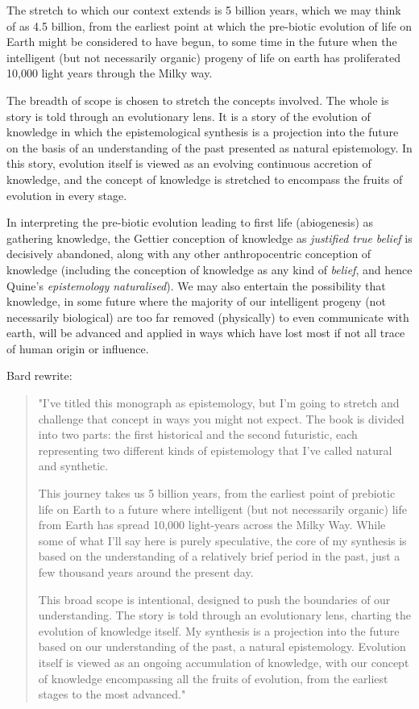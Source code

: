 \documentclass[10pt,titlepage]{book}
\begin{document}
The stretch to which our context extends is 5 billion years, which we may think of as 4.5 billion, from the earliest point at which the pre-biotic evolution of life on Earth might be considered to have begun, to some time in the future when the intelligent (but not necessarily organic) progeny of life on earth has proliferated 10,000 light years through the Milky way.

The breadth of scope is chosen to stretch the concepts involved.
The whole is story is told through an evolutionary lens.
It is a story of the evolution of knowledge in which the epistemological synthesis is a projection into the future on the basis of an understanding of the past presented as natural epistemology.
In this story, evolution itself is viewed as an evolving continuous accretion of knowledge, and the concept of knowledge is stretched to encompass the fruits of evolution in every stage.

In interpreting the pre-biotic evolution leading to first life (abiogenesis) as gathering knowledge, the Gettier conception of knowledge as \emph{justified true belief} is decisively abandoned, along with any other anthropocentric conception of knowledge (including the conception of knowledge as any kind of \emph{belief}, and hence Quine's \emph{epistemology naturalised}).
We may also entertain the possibility that knowledge, in some future where the majority of our intelligent progeny (not necessarily biological) are too far removed (physically) to even communicate with earth, will be advanced and applied in ways which have lost most if not all trace of human origin or influence.

Bard rewrite:
\begin{quote}

"I've titled this monograph as epistemology, but I'm going to stretch and challenge that concept in ways you might not expect. The book is divided into two parts: the first historical and the second futuristic, each representing two different kinds of epistemology that I've called natural and synthetic.

This journey takes us 5 billion years, from the earliest point of prebiotic life on Earth to a future where intelligent (but not necessarily organic) life from Earth has spread 10,000 light-years across the Milky Way. While some of what I'll say here is purely speculative, the core of my synthesis is based on the understanding of a relatively brief period in the past, just a few thousand years around the present day.

This broad scope is intentional, designed to push the boundaries of our understanding. The story is told through an evolutionary lens, charting the evolution of knowledge itself. My synthesis is a projection into the future based on our understanding of the past, a natural epistemology. Evolution itself is viewed as an ongoing accumulation of knowledge, with our concept of knowledge encompassing all the fruits of evolution, from the earliest stages to the most advanced."

\end{quote}
\end{document}

